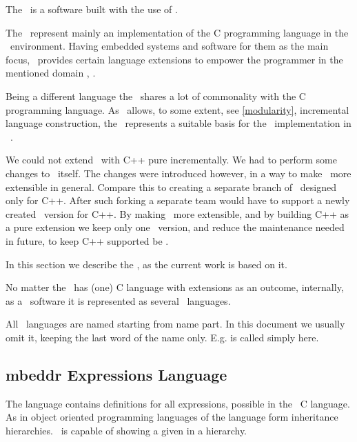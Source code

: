 
The \mbdp\ is a software built with the use of \jbmps.

The \mbdrp\ represent mainly an implementation of the C programming language in the \jbmps\ environment. Having embedded systems
and software for them as the main focus, \mbdr\ provides certain language extensions to empower the programmer in the mentioned domain \cite{mbeddr-wave}, 
\cite{Voelter:MoDELS:2010}. 

Being a different language the \cpppl\ shares a lot of commonality with the C programming language. 
As \jbmps\ allows, to some extent, see \ref{modularity}, incremental language construction, the \mbdrp\ represents 
a suitable basis for the \cpppl\ implementation in \jbmps\ . 

We could not  extend \mbdr\ with C++ pure incrementally. We had to perform some changes to \mbdr\ itself. 
The changes were introduced however, in a way to make \mbdr\ more extensible in general. Compare this to creating 
a separate branch of \mbdr\ designed only for C++. After such forking a separate team would have to support a newly
created \mbdr\ version for C++. By making \mbdr\ more extensible, and by building C++ as a pure extension we keep
only one \mbdr\ version, and reduce the maintenance needed in future, to keep C++ supported be \mbdr.


In this section we describe the \mbdp, as the current work is based on it.

No matter the \mbdp\ has  (one) C language with extensions as an outcome, internally, as a \jbmps\ software
it is represented as several \jbmps\ languages.

All \mbdr\ languages are named starting from  name part. In this document we usually omit it,
keeping the last word of the name only. E.g.  is called simply  here.

\subsection{mbeddr Expressions Language}
\label{expressionslang}

The  language contains definitions for all expressions, possible in the \mbdr\ C language.
As in object oriented programming languages  of the  language form inheritance hierarchies. 
\jbmps\ is capable of showing a given  in a hierarchy. 

